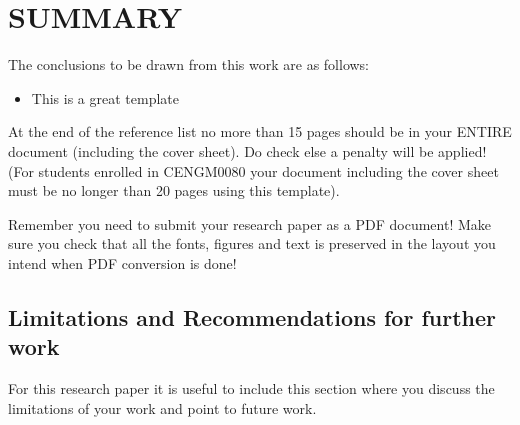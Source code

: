 \section{SUMMARY}
The conclusions to be drawn from this work are as follows:
\begin{itemize}
    \item 	This is a great template
\end{itemize}


At the end of the reference list no more than 15 pages should be in your ENTIRE document (including the cover sheet). Do check else a penalty will be applied!  (For students enrolled in CENGM0080 your document including the cover sheet must be no longer than 20 pages using this template).

Remember you need to submit your research paper as a PDF document! Make sure you check that all the fonts, figures and text is preserved in the layout you intend when PDF conversion is done!


\subsection{Limitations and Recommendations for further work}

For this research paper it is useful to include this section where you discuss the limitations of your work and point to future work.